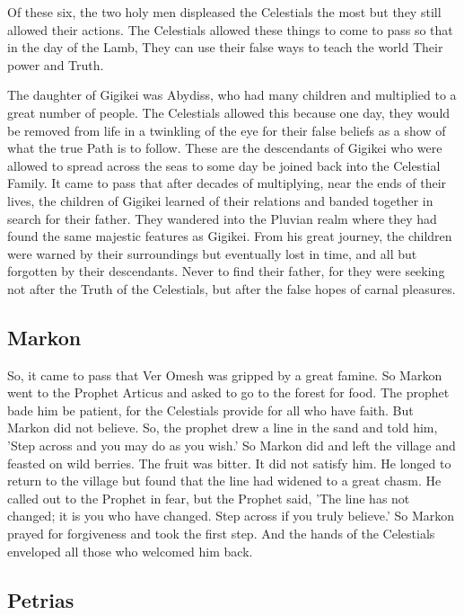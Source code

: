 Of these six, the two holy men displeased the Celestials the most but they still allowed their actions. The Celestials allowed these things to come to pass so that in the day of the Lamb, They can use their false ways to teach the world Their power and Truth.

The daughter of Gigikei was Abydiss, who had many children and multiplied to a great number of people. The Celestials allowed this because one day, they would be removed from life in a twinkling of the eye for their false beliefs as a show of what the true Path is to follow. These are the descendants of Gigikei who were allowed to spread across the seas to some day be joined back into the Celestial Family.
It came to pass that after decades of multiplying, near the ends of their lives, the children of Gigikei learned of their relations and banded together in search for their father. They wandered into the Pluvian realm where they had found the same majestic features as Gigikei. From his great journey, the children were warned by their surroundings but eventually lost in time, and all but forgotten by their descendants. Never to find their father, for they were seeking not after the Truth of the Celestials, but after the false hopes of carnal pleasures.

\subsection{Markon}

So, it came to pass that Ver Omesh was gripped by a great famine. So Markon went to the Prophet Articus and asked to go to the forest for food. The prophet bade him be patient, for the Celestials provide for all who have faith. But Markon did not believe. So, the prophet drew a line in the sand and told him, 'Step across and you may do as you wish.' So Markon did and left the village and feasted on wild berries. The fruit was bitter. It did not satisfy him. He longed to return to the village but found that the line had widened to a great chasm. He called out to the Prophet in fear, but the Prophet said, 'The line has not changed; it is you who have changed. Step across if you truly believe.' So Markon prayed for forgiveness and took the first step. And the hands of the Celestials enveloped all those who welcomed him back. 

\subsection{Petrias}

